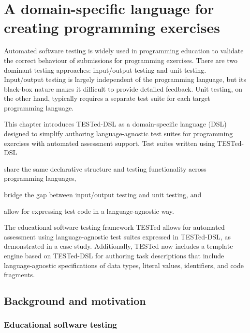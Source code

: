 \documentclass[../main]{subfiles}
\begin{document}
\chapter{A domain-specific language for creating programming exercises}\label{ch:tested-dsl}


Automated software testing is widely used in programming education to validate the correct behaviour of submissions for programming exercises.
There are two dominant testing approaches: input/output testing and unit testing.
Input/output testing is largely independent of the programming language, but its black-box nature makes it difficult to provide detailed feedback.
Unit testing, on the other hand, typically requires a separate test suite for each target programming language.

This chapter introduces TESTed-DSL as a domain-specific language (DSL) designed to simplify authoring language-agnostic test suites for programming exercises with automated assessment support.
Test suites written using TESTed-DSL
\begin{enumerate*}[label=\emph{\roman*})]
    \item share the same declarative structure and testing functionality across programming languages,
    \item bridge the gap between input/output testing and unit testing, and
    \item allow for expressing test code in a language-agnostic way.
\end{enumerate*}
The educational software testing framework TESTed allows for automated assessment using language-agnostic test suites expressed in TESTed-DSL, as demonstrated in a case study.
Additionally, TESTed now includes a template engine based on TESTed-DSL for authoring task descriptions that include language-agnostic specifications of data types, literal values, identifiers, and code fragments.

\section{Background and motivation}\label{sec:dsl-background-and-motivation}

\subsection{Educational software testing}\label{subsec:dsl-educational-software-testing}
\end{document}
